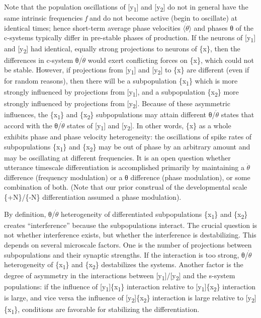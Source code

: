   Note that the population oscillations of [y\textsubscript{1}] and [y\textsubscript{2}] do not in general have the same intrinsic frequencies \textit{f} and do not become active (begin to oscillate) at identical times; hence short-term average phase velocities $\langle\dot{\theta}\rangle$ and phases θ of the c-systems typically differ in pre-stable phases of production. If the neurons of [y\textsubscript{1}] and [y\textsubscript{2}] had identical, equally strong projections to neurons of \{x\}, then the differences in c-system θ/$\dot{\theta}$ would exert conflicting forces on \{x\}, which could not be stable. However, if projections from [y\textsubscript{1}] and [y\textsubscript{2}] to \{x\} are different (even if for random reasons), then there will be a subpopulation \{x\textsubscript{1}\} which is more strongly influenced by projections from [y\textsubscript{1}], and a subpopulation \{x\textsubscript{2}\} more strongly influenced by projections from [y\textsubscript{2}]. Because of these asymmetric influences, the \{x\textsubscript{1}\} and \{x\textsubscript{2}\} subpopulations may attain different θ/$\dot{\theta}$ states that accord with the θ/$\dot{\theta}$ states of [y\textsubscript{1}] and [y\textsubscript{2}]. In other words, \{x\} as a whole exhibits phase and phase velocity heterogeneity: the oscillations of spike rates of subpopulations \{x\textsubscript{1}\} and \{x\textsubscript{2}\} may be out of phase by an arbitrary amount and may be oscillating at different frequencies. It is an open question whether utterance timescale differentiation is accomplished primarily by maintaining a $\dot{\theta}$ difference (frequency modulation) or a θ difference (phase modulation), or some combination of both. (Note that our prior construal of the developmental scale \{+N\}/\{-N\} differentiation assumed a phase modulation).

  By definition, θ/$\dot{\theta}$ heterogeneity of differentiated subpopulations \{x\textsubscript{1}\} and \{x\textsubscript{2}\} creates “interference” because the subpopulations interact. The crucial question is not whether interference exists, but whether the interference is destabilizing. This depends on several microscale factors. One is the number of projections between subpopulations and their synaptic strengths. If the interaction is too strong, θ/$\dot{\theta}$ heterogeneity of \{x\textsubscript{1}\} and \{x\textsubscript{2}\} destabilizes the systems. Another factor is the degree of asymmetry in the interactions between [y\textsubscript{1}]/[y\textsubscript{2}] and the s-system populations: if the influence of [y\textsubscript{1}]\{x\textsubscript{1}\} interaction relative to [y\textsubscript{1}]\{x\textsubscript{2}\} interaction is large, and vice versa the influence of [y\textsubscript{2}]\{x\textsubscript{2}\} interaction is large relative to [y\textsubscript{2}]\{x\textsubscript{1}\}, conditions are favorable for stabilizing the differentiation.

